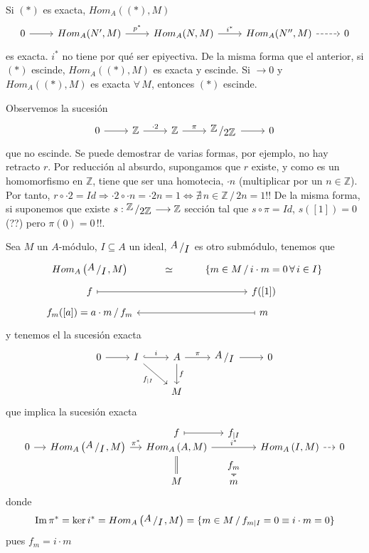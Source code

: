 Si $(*)$ es exacta, $Hom_A((*),M)$ 
$$ \bt 0 \arrow{r} & Hom_A(N',M) \arrow{r}{p^*} & Hom_A(N,M) \arrow{r}{i^*} & Hom_A(N'',M) \arrow[dashed]{r} & 0 \et$$
es exacta. $i^*$ no tiene por qu\'e ser epiyectiva. De la misma forma que el anterior, si $(*)$ escinde, $Hom_A((*),M)$ es exacta y escinde. Si $\longrightarrow 0$ y $Hom_A((*),M)$ es exacta $\forall \, M$, entonces $(*)$ escinde.
\begin{ejem} Observemos la sucesi\'on
    $$\bt 0 \arrow{r} & \mathbb Z \arrow{r}{\cdot 2} & \mathbb Z \arrow{r}{\pi} & \modulo{\mathbb Z}{2\mathbb Z} \arrow{r} & 0 \et$$
    que no escinde. Se puede demostrar de varias formas, por ejemplo, no hay retracto $r$. Por reducci\'on al absurdo, supongamos que $r$ existe, y como es un homomorfismo en $\mathbb Z$, tiene que ser una homotecia, $\cdot n$ (multiplicar por un $n \in \mathbb Z$). Por tanto, $r\circ \cdot 2 = Id \Rightarrow \cdot 2 \circ \cdot n = \cdot 2n = 1 \iff \nexists \, n \in \mathbb Z \, /\, 2n=1 !!$
    De la misma forma, si suponemos que existe $s: \modulo{\mathbb Z}{2\mathbb Z}\longrightarrow \mathbb Z$ secci\'on tal que $s\circ \pi =Id$, $s([1])=0$ (??) pero $\pi(0)=0 \, !!$.
\end{ejem}
\begin{ejem}
    Sea $M$ un $A$-m\'odulo, $I \subseteq A$ un ideal, $\modulo{A}{I}$ es otro subm\'odulo, tenemos que
    $$\bt Hom_A\left( \modulo{A}{I}, M \right) & \simeq & \left\{ m \in M \, / \, i \cdot m=0 \, \forall \, i \in I \right\} \\[-5mm]
    f \arrow[mapsto]{rr} & & f([1]) \\[-5mm]
     f_m([a]) = a\cdot m\, / \, f_m  & & \arrow[mapsto]{ll} m \et$$
     y tenemos el la sucesi\'on exacta
     $$\bt 0 \arrow{r} & I \arrow[swap]{rd}{f_{|I}} \arrow[hook]{r}{i} & A \arrow{d}{f} \arrow{r}{\pi} & \modulo{A}{I} \arrow{r} & 0 \\ 
            & & M
     \et$$
     que implica la sucesi\'on exacta
     $$\bt[row sep=small, column sep=small] & & f \arrow[mapsto]{r} & f_{|I} \\[-5mm] 0 \arrow{r} & Hom_A\left( \modulo{A}{I}, M \right) \arrow{r}{\pi^*} & Hom_A\left( A, M \right) \arrow{rr}{i^*} \arrow[equal]{dd} & & Hom_A\left( I, M \right) \arrow[dashed]{r} & 0 \\[-3mm] & & & f_m\arrow[mapsto]{d} & \\[-3mm] & & M & m & \et$$
     donde $$\Im \pi^* = \ker i^* = Hom_A\left( \modulo{A}{I}, M \right) =  \{ m \in M \, / \, f_{m|I} = 0 \equiv i \cdot m =0 \}$$
     pues $f_m = i \cdot m$
\end{ejem}
